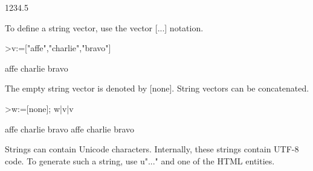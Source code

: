 \documentclass{article}
\begin{document}
\begin{eulernotebook}
\begin{euleroutput}
  1234.5
\end{euleroutput}
\begin{eulercomment}
To define a string vector, use the vector [...] notation.
\end{eulercomment}
\begin{eulerprompt}
>v:=["affe","charlie","bravo"]
\end{eulerprompt}
\begin{euleroutput}
  affe
  charlie
  bravo
\end{euleroutput}
\begin{eulercomment}
The empty string vector is denoted by [none]. String vectors can be
concatenated.
\end{eulercomment}
\begin{eulerprompt}
>w:=[none]; w|v|v
\end{eulerprompt}
\begin{euleroutput}
  affe
  charlie
  bravo
  affe
  charlie
  bravo
\end{euleroutput}
\begin{eulercomment}
Strings can contain Unicode characters. Internally, these strings contain
UTF-8 code. To generate such a string, use u"..." and one of the HTML
entities.


\end{eulercomment}
\end{eulernotebook}
\end{document}
